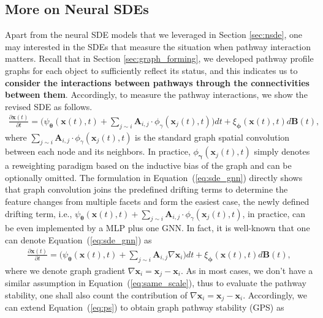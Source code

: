 \documentclass{article} %
\begin{document}
\subsection{More on Neural SDEs}\label{append:sde}
Apart from the neural SDE models that we leveraged in Section \ref{sec:nsde}, one may interested in the SDEs that measure the situation when pathway interaction matters. Recall that in Section \ref{sec:graph_forming}, we developed pathway profile graphs for each object to sufficiently reflect its status, and this indicates us to \textbf{consider the interactions between pathways through the connectivities between them}. Accordingly, to measure the pathway interactions, we show the revised SDE as follows. 
\begin{align}\label{eq:sde_gnn}
    \frac{\partial \mathbf x(t)}{\partial t} = \big(\psi_{\boldsymbol{\theta}} (\mathbf x(t), t) + \sum_{j\sim i}\mathbf A_{i,j} \cdot \phi_\gamma (\mathbf x_j(t),t )\big)dt + \xi_{\boldsymbol{\phi}}(\mathbf x(t), t)d\mathbf B(t), 
\end{align}
where $\sum_{j\sim i}\mathbf A_{i,j} \cdot \phi_\gamma (\mathbf x_j(t),t )$ is the standard graph spatial convolution between each node and its neighbors. In practice, $\phi_{\boldsymbol{\gamma}} (\mathbf x_j(t),t )$ simply denotes a reweighting paradigm based on the inductive bias of the graph and can be optionally omitted. The formulation in Equation~(\ref{eq:sde_gnn}) directly shows that graph convolution joins the predefined drifting terms to determine the feature changes from multiple facets and form the easiest case, the newly defined drifting term, i.e., $\psi_{\boldsymbol{\theta}} (\mathbf x(t), t) + \sum_{j\sim i}\mathbf A_{i,j} \cdot \phi_\gamma (\mathbf x_j(t),t )$, in practice, can be even implemented by a MLP plus one GNN. In fact, it is well-known that one can denote Equation~(\ref{eq:sde_gnn}) as
\begin{align}
    \frac{\partial \mathbf x(t)}{\partial t} = \big(\psi_{\boldsymbol{\theta}} (\mathbf x(t), t) + \sum_{j\sim i}\mathbf A_{i,j} \nabla\mathbf x_i\big)dt + \xi_{\boldsymbol{\phi}}(\mathbf x(t), t)d\mathbf B(t),
\end{align}
where we denote graph gradient $\nabla \mathbf x_i = \mathbf x_j - \mathbf x_i$. As in most cases, we don't have a similar assumption in Equation~(\ref{eq:same_scale}), thus to evaluate the pathway stability, one shall also count the contribution of $\nabla \mathbf x_i = \mathbf x_j - \mathbf x_i$. Accordingly, we can extend Equation~(\ref{eq:ps}) to obtain graph pathway stability (GPS) as  
\end{document}
